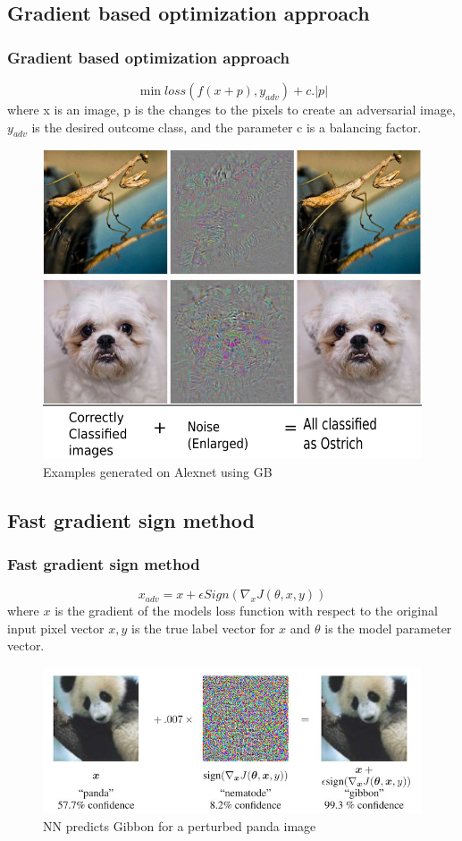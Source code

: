 \documentclass[14pt]{beamer}
\begin{document}
\subsection{Gradient based optimization approach}
\begin{frame}
\frametitle{Gradient based optimization approach}
$$\min loss(f(x + p), y_{adv}) + c.|p|$$
{\small where x is an image, p is the changes to the pixels to create an adversarial image, $y_{adv}$ is the desired outcome class, and the parameter c is a balancing factor.}

\begin{figure}
	\centering
	\includegraphics[width=0.35\linewidth, height=0.35\textheight]{img/adv_ex}
	\caption[Examples generated on Alexnet]{Examples generated on Alexnet using GB\protect\footnotemark}
	\label{fig:advex}
\end{figure}

\end{frame}

\subsection{Fast gradient sign method}
\begin{frame}
\frametitle{Fast gradient sign method}
$$x_{adv} = x + \epsilon Sign(\nabla_xJ(\theta,x,y))$$
where $x$ is the gradient of the models loss function with respect to the original input pixel vector $x, y$ is the true label vector for $x$ and $\theta$ is the model parameter vector.
\begin{figure}
	\centering
	\includegraphics[width=0.7\linewidth, height=0.3\textheight]{img/adversarial-panda}
	\caption{NN predicts Gibbon for a perturbed panda image\protect\footnotemark}
	\label{fig:adversarial-panda}
\end{figure}
\end{frame}
\end{document}
